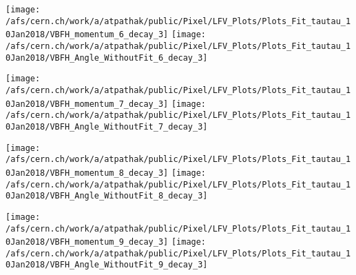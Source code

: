 \documentclass{beamer}
\begin{document}
\begin{frame}
\begin{normalsize}
\begin{center}
\texttt{[image: /afs/cern.ch/work/a/atpathak/public/Pixel/LFV\_Plots/Plots\_Fit\_tautau\_10Jan2018/VBFH\_momentum\_6\_decay\_3]}
\texttt{[image: /afs/cern.ch/work/a/atpathak/public/Pixel/LFV\_Plots/Plots\_Fit\_tautau\_10Jan2018/VBFH\_Angle\_WithoutFit\_6\_decay\_3]} 
\end{center}
\end{normalsize}
\end {frame}
\begin{frame}
\begin{normalsize}
\begin{center}
\texttt{[image: /afs/cern.ch/work/a/atpathak/public/Pixel/LFV\_Plots/Plots\_Fit\_tautau\_10Jan2018/VBFH\_momentum\_7\_decay\_3]}
\texttt{[image: /afs/cern.ch/work/a/atpathak/public/Pixel/LFV\_Plots/Plots\_Fit\_tautau\_10Jan2018/VBFH\_Angle\_WithoutFit\_7\_decay\_3]} 
\end{center}
\end{normalsize}
\end {frame}
\begin{frame}
\begin{normalsize}
\begin{center}
\texttt{[image: /afs/cern.ch/work/a/atpathak/public/Pixel/LFV\_Plots/Plots\_Fit\_tautau\_10Jan2018/VBFH\_momentum\_8\_decay\_3]}
\texttt{[image: /afs/cern.ch/work/a/atpathak/public/Pixel/LFV\_Plots/Plots\_Fit\_tautau\_10Jan2018/VBFH\_Angle\_WithoutFit\_8\_decay\_3]} 
\end{center}
\end{normalsize}
\end {frame}
\begin{frame}
\begin{normalsize}
\begin{center}
\texttt{[image: /afs/cern.ch/work/a/atpathak/public/Pixel/LFV\_Plots/Plots\_Fit\_tautau\_10Jan2018/VBFH\_momentum\_9\_decay\_3]}
\texttt{[image: /afs/cern.ch/work/a/atpathak/public/Pixel/LFV\_Plots/Plots\_Fit\_tautau\_10Jan2018/VBFH\_Angle\_WithoutFit\_9\_decay\_3]} 
\end{center}
\end{normalsize}
\end {frame}
\end{document}
